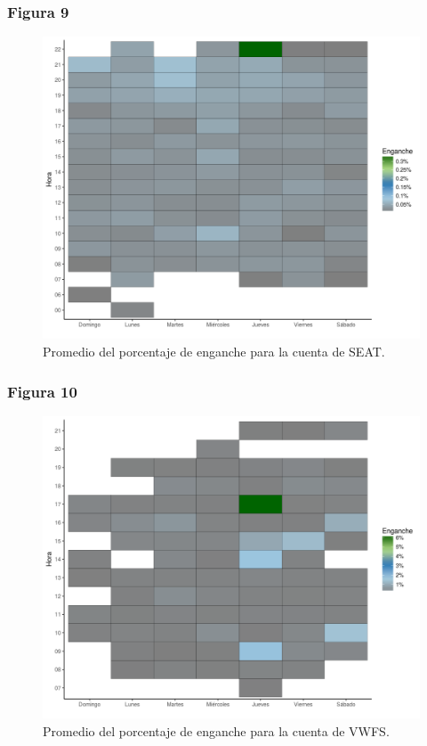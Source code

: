 \documentclass[a4paper,10pt]{article}
\begin{document}
\subsubsection{Figura 9}
\begin{figure}[H]
  \begin{center}
   \includegraphics[width=.85\textwidth]{imagenes/figuraEnganche1.png}
      \captionsetup{width=.80\textwidth}
   \caption{\centering Promedio del porcentaje de enganche para la cuenta de SEAT.} 
  \end{center} 
\end{figure}

\subsubsection{Figura 10}
\begin{figure}[H]
  \begin{center}
   \includegraphics[width=.85\textwidth]{imagenes/figuraEnganche2.png}
      \captionsetup{width=.80\textwidth}
   \caption{\centering Promedio del porcentaje de enganche para la cuenta de VWFS.} 
  \end{center} 
\end{figure}
\end{document}
